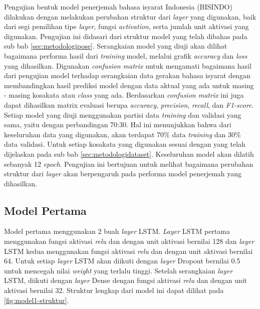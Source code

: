 Pengujian bentuk model penerjemah bahasa isyarat Indonesia (BISINDO) dilakukan dengan melakukan perubahan struktur dari \emph{layer} yang digunakan, baik dari segi pemilihan tipe \emph{layer}, fungsi \emph{activation}, serta jumlah unit aktivasi yang digunakan. Pengujian ini didasari dari struktur model yang telah dibahas pada sub bab \ref{sec:metodologipose}. Serangkaian model yang diuji akan dilihat bagaimana performa hasil dari \emph{training} model, melalui grafik \emph{accuracy} dan \emph{loss} yang dihasilkan. Digunakan \emph{confusion matrix} untuk mengamati bagaimana hasil dari pengujian model terhadap serangkaian data gerakan bahasa isyarat dengan membandingkan hasil prediksi model dengan data aktual yang ada untuk masing - masing kosakata atau \emph{class} yang ada. Berdasarkan \emph{confusion matrix} ini juga dapat dihasilkan matrix evaluasi berupa \emph{accuracy}, \emph{precision}, \emph{recall}, dan \emph{F1-score}. Setiap model yang diuji menggunakan partisi data \emph{training} dan validasi yang sama, yaitu dengan perbandingan 70:30. Hal ini menunjukkan bahwa dari keseluruhan data yang digunakan, akan terdapat 70\% data \emph{training} dan 30\% data validasi. Untuk setiap kosakata yang digunakan sesuai dengan yang telah dijelaskan pada sub bab \ref{sec:metodologidataset}. Keseluruhan model akan dilatih sebanyak 12 \emph{epoch}. Pengujian ini bertujuan untuk melihat bagaimana perubahan struktur dari \emph{layer} akan berpengaruh pada performa model penerjemah yang dihasilkan.

\subsection{Model Pertama}
\label{sec:analisismodel1}
Model pertama menggunakan 2 buah \emph{layer} LSTM. \emph{Layer} LSTM pertama menggunakan fungsi aktivasi \emph{relu} dan dengan unit aktivasi bernilai 128 dan \emph{layer} LSTM kedua menggunakan fungsi aktivasi \emph{relu} dan dengan unit aktivasi bernilai 64. Untuk setiap \emph{layer} LSTM akan diikuti dengan \emph{layer} Dropout bernilai 0.5 untuk mencegah nilai \emph{weight} yang terlalu tinggi. Setelah serangkaian \emph{layer} LSTM, diikuti dengan \emph{layer} Dense dengan fungsi aktivasi \emph{relu} dan dengan unit aktivasi bernilai 32. Struktur lengkap dari model ini dapat dilihat pada \ref{fig:model1-struktur}.


